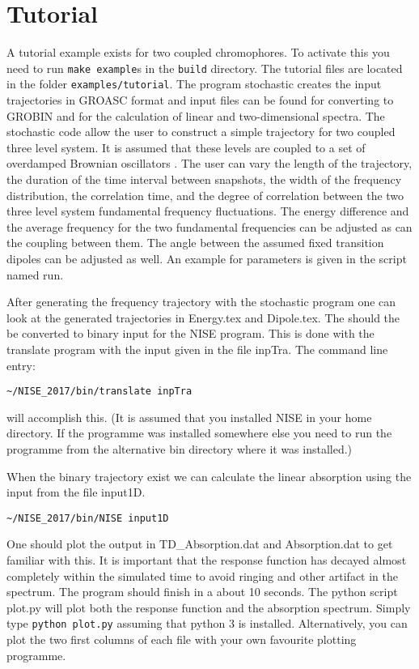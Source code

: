 \chapter{Tutorial}
A tutorial example exists for two coupled chromophores. To activate this you need to run {\tt make example}s in the {\tt build} directory. The tutorial files are located in the folder {\tt examples/tutorial}. The program stochastic creates the input 
trajectories in GROASC format and input files can be found for converting to GROBIN and for the
calculation of linear and two-dimensional spectra. The stochastic code allow the user to construct
a simple trajectory for two coupled three level system. It is assumed that these levels are coupled
to a set of overdamped Brownian oscillators \cite{Mukamel.1995.B01}.
The user can vary the length of the trajectory, the duration of the time interval between snapshots, the 
width of the frequency distribution, the correlation time, and the degree of correlation between the
two three level system fundamental frequency fluctuations. The energy difference and the average frequency for the two fundamental frequencies can be adjusted as can the coupling between them.
The angle between the assumed fixed transition dipoles can be adjusted as well. An example for
parameters is given in the script named run. 

After generating the frequency trajectory with the stochastic program one can look at the generated
trajectories in Energy.tex and Dipole.tex. The should the be converted to binary input for the NISE
program. This is done with the translate program with the input given in the file inpTra.
The command line entry:
\begin{verbatim}
~/NISE_2017/bin/translate inpTra
\end{verbatim}
will accomplish this. (It is assumed that you installed NISE in your home directory. If the programme was installed somewhere else you need to run the programme from the alternative bin directory where it was installed.)

When the binary trajectory exist we can calculate the linear absorption using the input from the file input1D.
\begin{verbatim}
~/NISE_2017/bin/NISE input1D
\end{verbatim}
One should plot the output in TD\_Absorption.dat and Absorption.dat to get familiar with this. It is 
important that the response function has decayed almost completely within the simulated 
time to avoid ringing and other artifact in the spectrum. The program should finish in a 
about 10 seconds. The python script plot.py will plot both the response function and the absorption spectrum. Simply type {\tt python plot.py} assuming that python 3 is installed. Alternatively, you can plot the two first columns of each file with your own favourite plotting programme.

